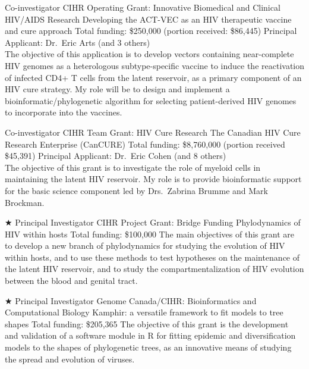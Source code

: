 \documentclass[11pt]{moderncv}
\begin{document}
{Co-investigator}
{CIHR Operating Grant: Innovative Biomedical and Clinical HIV/AIDS Research}
{Developing the ACT-VEC as an HIV therapeutic vaccine and cure approach}
{Total funding: \$250,000 (portion received: \$86,445)}
{
Principal Applicant: Dr.~Eric Arts (and 3 others)\\
The objective of this application is to develop vectors containing near-complete HIV genomes as a heterologous subtype-specific vaccine to induce the reactivation of infected CD4+ T cells from the latent reservoir, as a primary component of an HIV cure strategy.
My role will be to design and implement a bioinformatic/phylogenetic algorithm for selecting patient-derived HIV genomes to incorporate into the vaccines.\\
}

{Co-investigator}
{CIHR Team Grant: HIV Cure Research}
{The Canadian HIV Cure Research Enterprise (CanCURE)}
{Total funding: \$8,760,000 (portion received \$45,391)}
{
Principal Applicant: Dr.~Eric Cohen (and 8 others)\\
The objective of this grant is to investigate the role of myeloid cells in maintaining the latent HIV reservoir.
My role is to provide bioinformatic support for the basic science component led by Drs.~Zabrina Brumme and Mark Brockman.\\
}

{$\bigstar$ Principal Investigator}
{CIHR Project Grant: Bridge Funding}
{Phylodynamics of HIV within hosts}
{Total funding: \$100,000}
{
The main objectives of this grant are to develop a new branch of phylodynamics for studying the evolution of HIV within hosts, and to use these methods to test hypotheses on the maintenance of the latent HIV reservoir, and to study the compartmentalization of HIV evolution between the blood and genital tract.\\
}


{$\bigstar$ Principal Investigator}  %
{Genome Canada/CIHR: Bioinformatics and Computational Biology}
{Kamphir: a versatile framework to fit models to tree shapes}
{Total funding: \$205,365}
{
The objective of this grant is the development and validation of a software module in R for fitting epidemic and diversification models to the shapes of phylogenetic trees, as an innovative means of studying the spread and evolution of viruses.\\
}
\end{document}
